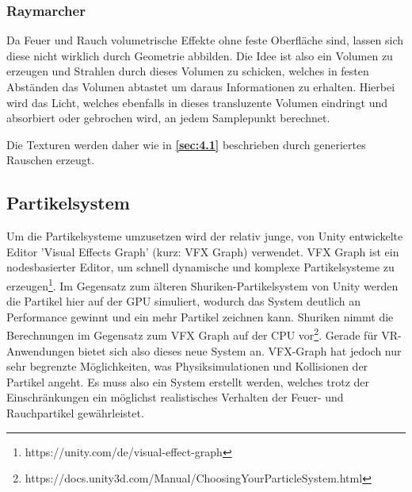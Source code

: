 \subsubsection{Raymarcher}

Da Feuer und Rauch volumetrische Effekte ohne feste Oberfläche sind, lassen sich diese nicht wirklich durch Geometrie abbilden. Die Idee ist also ein
Volumen zu erzeugen und Strahlen durch dieses Volumen zu schicken, welches in festen Abständen das Volumen abtastet um daraus Informationen zu erhalten.
Hierbei wird das Licht, welches ebenfalls in dieses transluzente Volumen eindringt und absorbiert oder gebrochen wird, an jedem Samplepunkt berechnet.

Die Texturen werden daher wie in \textbf{\autoref{sec:4.1}} beschrieben durch generiertes Rauschen erzeugt.



\subsection{Partikelsystem}
Um die Partikelsysteme umzusetzen wird der relativ junge, von Unity entwickelte Editor 'Visual Effects Graph'
(kurz: VFX Graph) verwendet. VFX Graph ist ein nodesbasierter Editor, um schnell
dynamische und komplexe Partikelsysteme zu erzeugen\footnote{https://unity.com/de/visual-effect-graph}.
Im Gegensatz zum älteren Shuriken-Partikelsystem von Unity werden die Partikel hier auf der GPU
simuliert, wodurch das System deutlich an Performance gewinnt und ein mehr Partikel zeichnen kann.
Shuriken nimmt die Berechnungen im Gegensatz zum VFX Graph auf der CPU vor\footnote{https://docs.unity3d.com/Manual/ChoosingYourParticleSystem.html}.
Gerade für VR-Anwendungen bietet sich also dieses neue System an.
VFX-Graph hat jedoch nur sehr begrenzte Möglichkeiten, was Physiksimulationen und Kollisionen der Partikel angeht.
Es muss also ein System erstellt werden, welches trotz der Einschränkungen ein möglichst realistisches
Verhalten der Feuer- und Rauchpartikel gewährleistet.




\newpage
